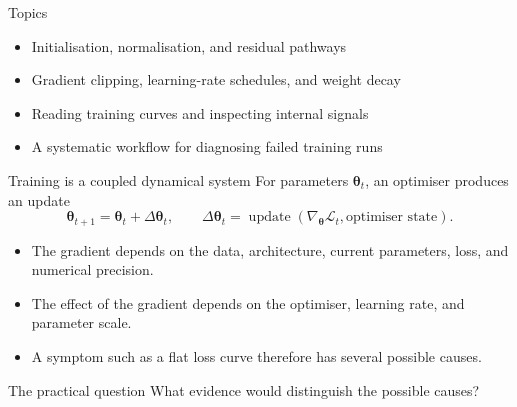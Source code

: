 \newcommand{\lecturetitle}{Practical Training of Deep Networks}
\newcommand{\lecturesubtitle}{Normalisation, stabilisation, and diagnosis}
\newcommand{\covertext}{Make\\training\\work}
\newcommand{\includeexternalpdfpages}{}




\begin{frame}{Topics}
\begin{itemize}
  \item Initialisation, normalisation, and residual pathways
  \item Gradient clipping, learning-rate schedules, and weight decay
  \item Reading training curves and inspecting internal signals
  \item A systematic workflow for diagnosing failed training runs
\end{itemize}
\end{frame}


\begin{frame}{Training is a coupled dynamical system}
For parameters $\bm\theta_t$, an optimiser produces an update
\[
  \bm\theta_{t+1}
  = \bm\theta_t + \Delta\bm\theta_t,
  \qquad
  \Delta\bm\theta_t
  = \operatorname{update}(\nabla_{\bm\theta}\mathcal L_t,
                           \text{optimiser state}).
\]

\begin{itemize}
  \item The gradient depends on the data, architecture, current parameters, loss, and numerical precision.
  \item The effect of the gradient depends on the optimiser, learning rate, and parameter scale.
  \item A symptom such as a flat loss curve therefore has several possible causes.
\end{itemize}

\begin{block}{The practical question}
What evidence would distinguish the possible causes?
\end{block}
\end{frame}


